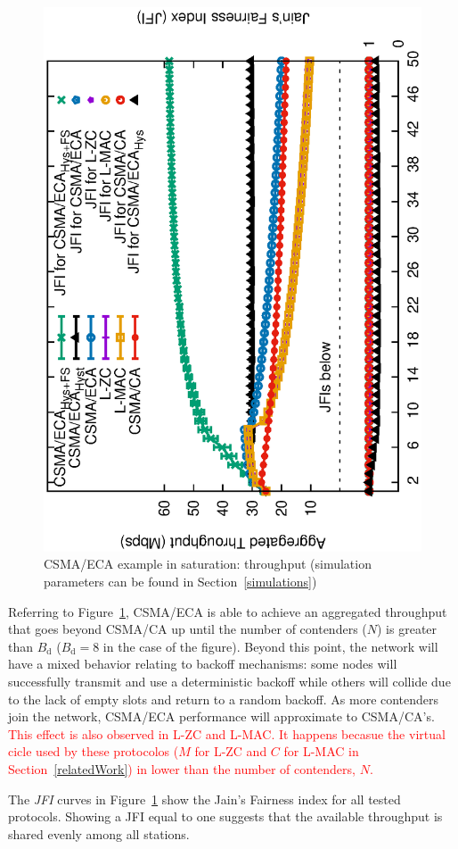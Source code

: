 \begin{figure}[tb]
\centering
  \includegraphics[width=0.7\linewidth, angle=-90]{figures/tonFigs/DCF-v-ECA-TON.eps}
  \caption{CSMA/ECA example in saturation: throughput (simulation parameters can be found in Section~\ref{simulations})}
  \label{fig:BECA}
\end{figure}

Referring to Figure~\ref{fig:BECA}, CSMA/ECA is able to achieve an aggregated throughput that goes beyond CSMA/CA up until the number of contenders ($N$) is greater than $B_{\text{d}}$ ($B_{\text{d}}=8$ in the case of the figure). Beyond this point, the network will have a mixed behavior relating to backoff mechanisms: some nodes will successfully transmit and use a deterministic backoff while others will collide due to the lack of empty slots and return to a random backoff. As more contenders join the network, CSMA/ECA performance will approximate to CSMA/CA's. \textcolor{red}{This effect is also observed in L-ZC and L-MAC. It happens becasue the virtual cicle used by these protocolos ($M$ for L-ZC and $C$ for L-MAC in Section~\ref{relatedWork}) in lower than the number of contenders, $N$.}

The \emph{JFI } curves in Figure~\ref{fig:BECA} show the Jain's Fairness index for all tested protocols. Showing a JFI equal to one suggests that the available throughput is shared evenly among all stations.

